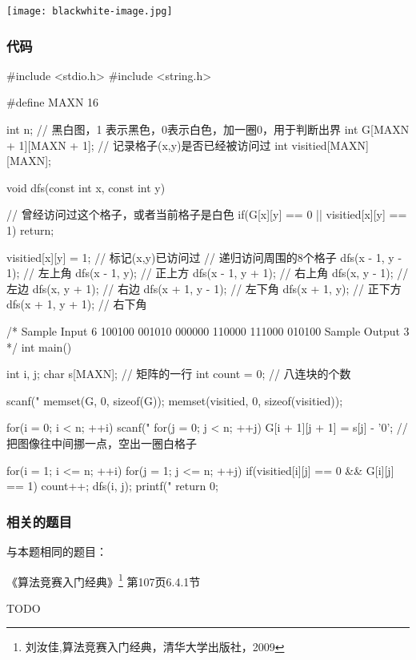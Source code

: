 \begin{center}
\texttt{[image: blackwhite-image.jpg]}\\
\label{fig:blackwhiteImage}
\end{center}

\subsubsection{代码}
\begin{Codex}[label=blackwhite_image.c]
#include <stdio.h>
#include <string.h>

#define MAXN 16

int n;
// 黑白图，1 表示黑色，0表示白色，加一圈0，用于判断出界
int G[MAXN + 1][MAXN + 1];
// 记录格子(x,y)是否已经被访问过
int visitied[MAXN][MAXN];

void dfs(const int x, const int y) {
    // 曾经访问过这个格子，或者当前格子是白色
    if(G[x][y] == 0 || visitied[x][y] == 1)  return;
    
    visitied[x][y] = 1; // 标记(x,y)已访问过
    // 递归访问周围的8个格子
    dfs(x - 1, y - 1); // 左上角
    dfs(x - 1, y); // 正上方
    dfs(x - 1, y + 1); // 右上角
    dfs(x, y - 1); // 左边
    dfs(x, y + 1); // 右边
    dfs(x + 1, y - 1); // 左下角
    dfs(x + 1, y); // 正下方
    dfs(x + 1, y + 1); // 右下角
}

/*
Sample Input
6
100100
001010
000000
110000
111000
010100
Sample Output
3
*/
int main() {
    int i, j;
    char s[MAXN]; // 矩阵的一行
    int count = 0; // 八连块的个数

    scanf("%
    memset(G, 0, sizeof(G));
    memset(visitied, 0, sizeof(visitied));

    for(i = 0; i < n; ++i) {
        scanf("%
        for(j = 0; j < n; ++j) {
            G[i + 1][j + 1] = s[j] - '0'; // 把图像往中间挪一点，空出一圈白格子
        }
    }


    for(i = 1; i <= n; ++i) {
        for(j = 1; j <= n; ++j) {
            if(visitied[i][j] == 0 && G[i][j] == 1) {
                count++;
                dfs(i, j);
            }
        }
    }
    printf("%
    return 0;
}
\end{Codex}

\subsubsection{相关的题目}
与本题相同的题目：
\begindot
\item 《算法竞赛入门经典》\footnote{刘汝佳,算法竞赛入门经典，清华大学出版社，2009} 第107页6.4.1节
\item  TODO
\myenddot

